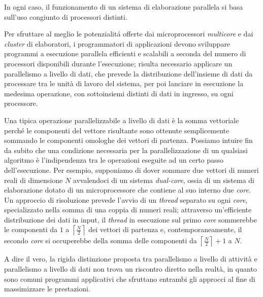 In ogni caso, il funzionamento di un sistema di elaborazione parallela si basa sull'uso congiunto di processori distinti.

Per sfruttare al meglio le potenzialit\'a offerte dai microprocessori \textit{multicore} e dai \textit{cluster} di elaboratori, i programmatori di applicazioni devono sviluppare programmi a esecuzione
parallela efficienti e scalabili a seconda del numero di processori disponibili durante l'esecuzione; risulta necessario applicare un parallelismo a livello di
dati, che prevede la distribuzione dell'insieme di dati da processare tra le unit\`a di lavoro del sistema, per poi lanciare in esecuzione la
medesima operazione, con sottoinsiemi distinti di dati in ingresso, su ogni processore.

Una tipica operazione parallelizzabile a livello di dati \`e la somma vettoriale perch\'e le componenti del vettore risultante sono ottenute
semplicemente sommando le componenti omologhe dei vettori di partenza. \newline
Possiamo intuire fin da subito che una condizione necessaria per la parallelizzazione di un qualsiasi algoritmo \`e l'indipendenza tra le operazioni eseguite ad un certo passo dell'esecuzione.\newline
Per esempio, supponiamo di dover sommare due vettori di numeri reali di dimensione $N$ avvalendoci di un sistema \textit{dual-core}, ossia di un sistema di elaborazione dotato di un microprocessore che contiene al suo interno
due \textit{core}.\newline
Un approccio di risoluzione prevede l'avvio di un \textit{thread} separato su ogni \textit{core}, specializzato nella somma di una coppia di numeri reali; attraverso un'efficiente distribuzione dei dati in input, il \textit{thread} in esecuzione sul primo \textit{core} sommerebbe le componenti da $1$ a $\left\lceil\frac{N}{2}\right\rceil$ dei vettori di partenza
e, contemporaneamente, il secondo \textit{core} si occuperebbe della somma delle componenti da $\left\lceil\frac{N}{2}\right\rceil + 1$ a $N$.

A dire il vero, la rigida distinzione proposta tra parallelismo a livello di attivit\`a e parallelismo a livello di dati non trova un
riscontro diretto nella realt\`a, in quanto sono comuni programmi applicativi che sfruttano entrambi gli approcci al fine di massimizzare le prestazioni.

